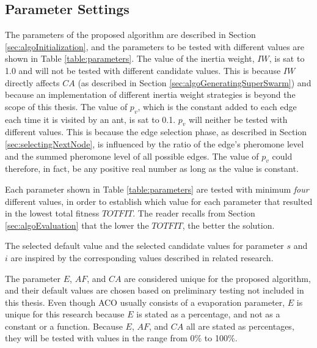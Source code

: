 \subsection{Parameter Settings}
\label{subsec:parameterSettings_setup}

The parameters of the proposed algorithm are described in Section \vref{sec:algoInitialization}, and the parameters 
to be tested with different values are shown in Table \ref{table:parameters}. The value of the inertia weight, $IW$, is sat to 1.0 and will not be tested with different candidate values. This is because $IW$ directly affects $CA$ (as described in Section \vref{sec:algoGeneratingSuperSwarm}) and because an implementation of different inertia weight strategies is beyond the scope of this thesis. The value of $p_v$, which is the constant added to each edge each time it is visited by an ant, is sat to 0.1. $p_v$ will neither be tested with different values. This is because the edge selection phase, as described in Section \vref{sec:selectingNextNode}, is influenced by the ratio of the edge's pheromone level and the summed pheromone level of all possible edges. The value of $p_v$ could therefore, in fact, be any positive real number as long as the value is constant.

Each parameter shown in Table \ref{table:parameters} are tested with minimum \textit{four} different values, in order to establish which value for each parameter that resulted in the lowest total fitness $TOTFIT$. The reader recalls from Section \vref{sec:algoEvaluation} that the lower the $TOTFIT$, the better the solution. 

The selected default value and the selected candidate values for parameter $s$ and $i$ are inspired by the corresponding values described in related research\citep{salehi-nezhad07, poorzahedy11, sedighpour14, kechagiopoulos14}.

The parameter $E$, $AF$, and $CA$ are considered unique for the proposed algorithm, and their default values are chosen based on preliminary testing not included in this thesis. Even though ACO usually consists of a evaporation parameter, $E$ is unique for this research because $E$ is stated as a percentage, and not as a constant or a function. 
Because $E$, $AF$, and $CA$ all are stated as percentages, they will be tested with values in the range from 0\% to 100\%. %

